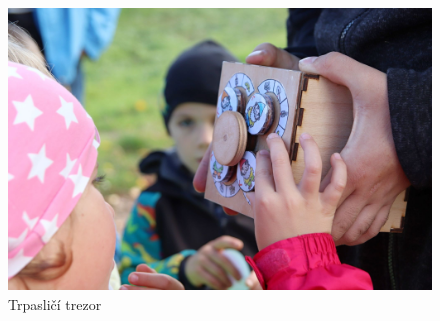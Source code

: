 \begin{figure}[htbp]
    \centering
    \includegraphics[width=\textwidth]{kapitoly/obrazky/M3/trpaslici.png}
    \caption{Trpasličí trezor}
    \label{fig:M3-trpaslici}
\end{figure}

